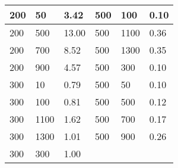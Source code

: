 \begin{table}[h]
\begin{tabular}{lll||lll}
200 & 50   & 3.42     & 500 & 100  & 0.10   \\ \hline
200 & 500  & 13.00    & 500 & 1100 & 0.36   \\ \hline
200 & 700  & 8.52     & 500 & 1300 & 0.35   \\ \hline
200 & 900  & 4.57     & 500 & 300  & 0.10   \\ \hline
300 & 10   & 0.79     & 500 & 50   & 0.10   \\ \hline
300 & 100  & 0.81     & 500 & 500  & 0.12   \\ \hline
300 & 1100 & 1.62     & 500 & 700  & 0.17   \\ \hline
300 & 1300 & 1.01     & 500 & 900  & 0.26   \\ \hline
300 & 300  & 1.00     &     &      &        \\ \hline \hline
\end{tabular}
\end{table}



